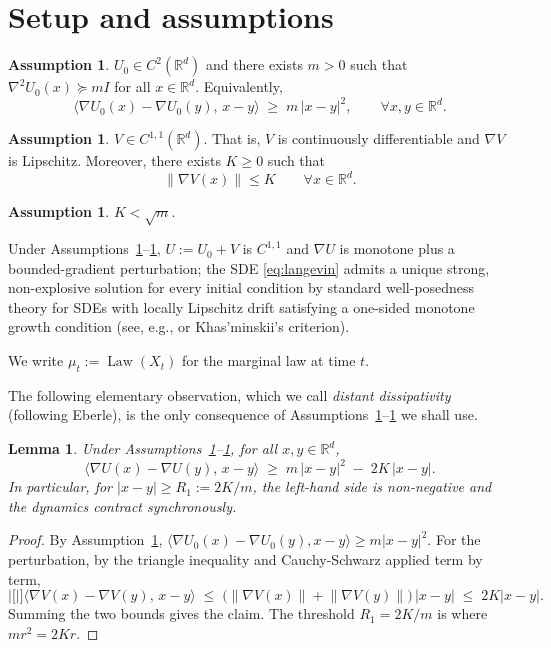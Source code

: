 \documentclass[11pt]{article}
\newtheorem{lemma}[theorem]{Lemma}
\theoremstyle{definition}
\newtheorem{assumption}[theorem]{Assumption}
\DeclareMathOperator{\Law}{Law}
\newcommand{\R}{\mathbb{R}}
\newcommand{\norm}[1]{\left\lVert #1 \right\rVert}
\newcommand{\abs}[1]{\left\lvert #1 \right\rvert}
\begin{document}
\section{Setup and assumptions}\label{sec:setup}

\begin{assumption}\label{A1}
$U_0 \in C^2(\R^d)$ and there exists $m > 0$ such that $\nabla^2 U_0(x) \succeq m I$ for all $x \in \R^d$. Equivalently,
\[
\langle \nabla U_0(x) - \nabla U_0(y),\, x - y \rangle \;\ge\; m\,\abs{x-y}^2, \qquad \forall x,y \in \R^d.
\]
\end{assumption}

\begin{assumption}\label{A2}
$V \in C^{1,1}(\R^d)$. That is, $V$ is continuously differentiable and $\nabla V$ is Lipschitz. Moreover, there exists $K \ge 0$ such that
\[
\norm{\nabla V(x)} \le K \qquad \forall x \in \R^d.
\]
\end{assumption}

\begin{assumption}\label{A3}
$K < \sqrt m$.
\end{assumption}

Under Assumptions~\ref{A1}--\ref{A2}, $U := U_0 + V$ is $C^{1,1}$ and $\nabla U$ is monotone plus a bounded-gradient perturbation; the SDE \eqref{eq:langevin} admits a unique strong, non-explosive solution for every initial condition by standard well-posedness theory for SDEs with locally Lipschitz drift satisfying a one-sided monotone growth condition (see, e.g., \cite[Thm.~2.4.1]{PrevotRoeckner2007} or Khas'minskii's criterion).

We write $\mu_t := \Law(X_t)$ for the marginal law at time $t$.

The following elementary observation, which we call \emph{distant dissipativity} (following Eberle), is the only consequence of Assumptions~\ref{A1}--\ref{A2} we shall use.

\begin{lemma}\label{lem:distant}
Under Assumptions~\ref{A1}--\ref{A2}, for all $x, y \in \R^d$,
\[
\langle \nabla U(x) - \nabla U(y),\, x-y \rangle \;\ge\; m\,\abs{x-y}^2 \;-\; 2K\,\abs{x-y}.
\]
In particular, for $\abs{x-y} \ge R_1 := 2K/m$, the left-hand side is non-negative and the dynamics contract synchronously.
\end{lemma}

\begin{proof}
By Assumption~\ref{A1}, $\langle \nabla U_0(x) - \nabla U_0(y), x-y\rangle \ge m\abs{x-y}^2$. For the perturbation, by the triangle inequality and Cauchy-Schwarz applied term by term,
\[
\abs[\Big]{\langle \nabla V(x) - \nabla V(y),\, x-y\rangle} \;\le\; \bigl(\norm{\nabla V(x)} + \norm{\nabla V(y)}\bigr)\,\abs{x-y} \;\le\; 2K\abs{x-y}.
\]
Summing the two bounds gives the claim. The threshold $R_1 = 2K/m$ is where $m r^2 = 2Kr$.
\end{proof}
\end{document}

